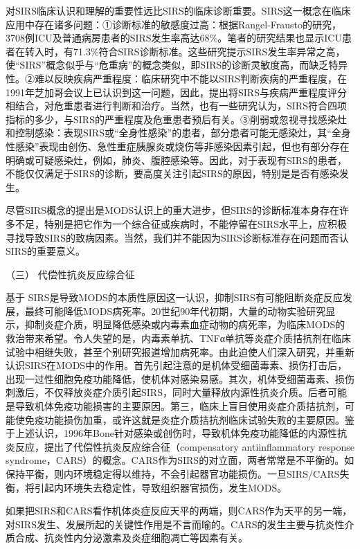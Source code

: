 对SIRS临床认识和理解的重要性远比SIRS的临床诊断重要。SIRS这一概念在临床应用中存在诸多问题：①诊断标准的敏感度过高：根据Rangel-Frausto的研究，3708例ICU及普通病房患者的SIRS发生率高达68\%。笔者的研究结果也显示ICU患者在转入时，有71.3\%符合SIRS诊断标准。这些研究提示SIRS发生率异常之高，使“SIRS”概念似乎与“危重病”的概念类似，即SIRS的诊断灵敏度高，而缺乏特异性。②难以反映疾病严重程度：临床研究中不能以SIRS判断疾病的严重程度，在1991年芝加哥会议上已认识到这一问题，因此，提出将SIRS与疾病严重程度评分相结合，对危重患者进行判断和治疗。当然，也有一些研究认为，SIRS符合四项指标的多少，与SIRS的严重程度及危重患者预后有关。③削弱或忽视寻找感染灶和控制感染：表现SIRS或“全身性感染”的患者，部分患者可能无感染灶，其“全身性感染”表现由创伤、急性重症胰腺炎或烧伤等非感染因素引起，但也有部分存在明确或可疑感染灶，例如，肺炎、腹腔感染等。因此，对于表现有SIRS的患者，不能仅仅满足于SIRS的诊断，要高度关注引起SIRS的原因，特别是是否有感染发生。

尽管SIRS概念的提出是MODS认识上的重大进步，但SIRS的诊断标准本身存在许多不足，特别是把它作为一个综合征或疾病时，不能停留在SIRS水平上，应积极寻找导致SIRS的致病因素。当然，我们并不能因为SIRS诊断标准存在问题而否认SIRS的重要意义。

\hypertarget{text00093.htmlux5cux23CHP3-11-2-4-3}{}
（三） 代偿性抗炎反应综合征

基于
SIRS是导致MODS的本质性原因这一认识，抑制SIRS有可能阻断炎症反应发展，最终可能降低MODS病死率。20世纪90年代初期，大量的动物实验研究显示，抑制炎症介质，明显降低感染或内毒素血症动物的病死率，为临床MODS的救治带来希望。令人失望的是，内毒素单抗、TNFα单抗等炎症介质拮抗剂在临床试验中相继失败，甚至个别研究报道增加病死率。由此迫使人们深入研究，并重新认识SIRS在MODS中的作用。首先引起注意的是机体受细菌毒素、损伤打击后，出现一过性细胞免疫功能降低，使机体对感染易感。其次，机体受细菌毒素、损伤刺激后，不仅释放炎症介质引起SIRS，同时大量释放内源性抗炎介质。后者可能是导致机体免疫功能损害的主要原因。第三，临床上盲目使用炎症介质拮抗剂，可能使免疫功能损伤加重，或许这就是炎症介质拮抗剂临床试验失败的主要原因。鉴于上述认识，1996年Bone针对感染或创伤时，导致机体免疫功能降低的内源性抗炎反应，提出了代偿性抗炎反应综合征（compensatory
antiinflammatory response
syndrome，CARS）的概念。CARS作为SIRS的对立面，两者常常是不平衡的。如保持平衡，则内环境稳定得以维持，不会引起器官功能损伤。一旦SIRS/CARS失衡，将引起内环境失去稳定性，导致组织器官损伤，发生MODS。

如果把SIRS和CARS看作机体炎症反应天平的两端，则CARS作为天平的另一端，对SIRS发生、发展所起的关键性作用是不言而喻的。CARS的发生主要与抗炎性介质合成、抗炎性内分泌激素及炎症细胞凋亡等因素有关。


